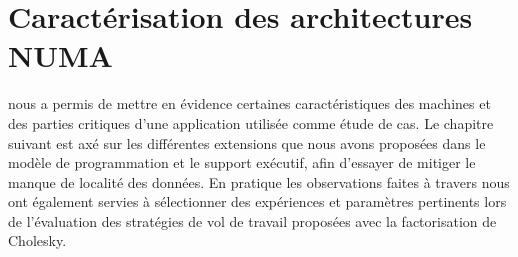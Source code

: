 

\chapter{Caractérisation des architectures NUMA}\label{chap:contrib:characterization}
\chaptertoc






\bigskip
\bigskip

\tool nous a permis de mettre en évidence certaines caractéristiques des machines et des parties critiques d'une application utilisée comme étude de cas.
Le chapitre suivant est axé sur les différentes extensions que nous avons proposées dans le modèle de programmation et le support exécutif, afin d'essayer de mitiger le manque de localité des données.
En pratique les observations faites à travers \outil nous ont également servies à sélectionner des expériences et paramètres pertinents lors de l'évaluation des stratégies de vol de travail proposées avec la factorisation de Cholesky.
